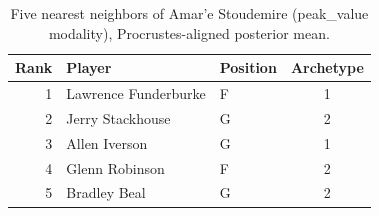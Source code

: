 \begin{table}[htbp]
  \centering\small
  \begin{tabular}{rllc}
    \toprule
    Rank & Player & Position & Archetype \\
    \midrule
    1 & Lawrence Funderburke & F & 1 \\
    2 & Jerry Stackhouse & G & 2 \\
    3 & Allen Iverson & G & 1 \\
    4 & Glenn Robinson & F & 2 \\
    5 & Bradley Beal & G & 2 \\
    \bottomrule
  \end{tabular}
  \caption{Five nearest neighbors of Amar'e Stoudemire (peak_value modality), Procrustes-aligned posterior mean.}
  \label{tab:Amar_e_Stoudemire_neighbors_peak_value}
\end{table}

